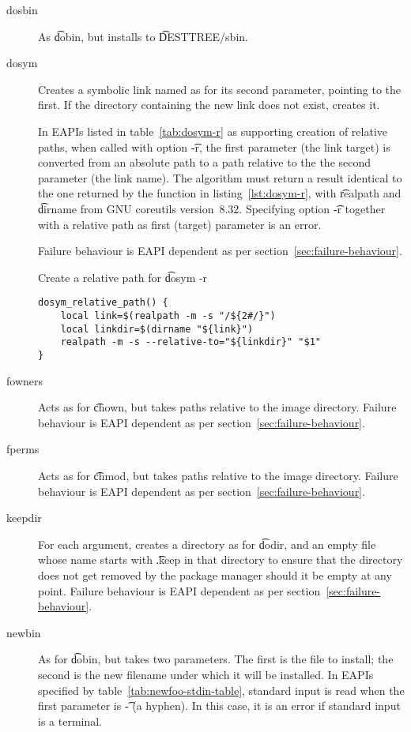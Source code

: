 \begin{description}
\item[dosbin] As \t{dobin}, but installs to \t{DESTTREE/sbin}.

\item[dosym] Creates a symbolic link named as for its second parameter, pointing to the first.
    If the directory containing the new link does not exist, creates it.

     In EAPIs listed in table~\ref{tab:dosym-r} as supporting creation
    of relative paths, when called with option \t{-r}, the first parameter (the link target) is
    converted from an absolute path to a path relative to the the second parameter (the link name).
    The  algorithm must return a result identical to the one returned by the function in
    listing~\ref{lst:dosym-r}, with \t{realpath} and \t{dirname} from GNU coreutils version~8.32.
    Specifying option \t{-r} together with a relative path as first (target) parameter is an error.

    Failure behaviour is EAPI dependent as per section~\ref{sec:failure-behaviour}.

\begin{listing}[h]
\caption{Create a relative path for \t{dosym -r}} \label{lst:dosym-r}
\begin{verbatim}
dosym_relative_path() {
    local link=$(realpath -m -s "/${2#/}")
    local linkdir=$(dirname "${link}")
    realpath -m -s --relative-to="${linkdir}" "$1"
}
\end{verbatim}
\end{listing}

\item[fowners] Acts as for \t{chown}, but takes paths relative to the image directory. Failure
    behaviour is EAPI dependent as per section~\ref{sec:failure-behaviour}.

\item[fperms] Acts as for \t{chmod}, but takes paths relative to the image directory. Failure
    behaviour is EAPI dependent as per section~\ref{sec:failure-behaviour}.

\item[keepdir] For each argument, creates a directory as for \t{dodir}, and an empty file whose
    name starts with \t{.keep} in that directory to ensure that the directory does not get removed
    by the package manager should it be empty at any point. Failure behaviour is EAPI dependent
    as per section~\ref{sec:failure-behaviour}.

\item[newbin]  As for \t{dobin}, but takes two parameters. The first is
    the file to install; the second is the new filename under which it will be installed. In EAPIs
    specified by table~\ref{tab:newfoo-stdin-table}, standard input is read when the first
    parameter is \t{-} (a hyphen). In this case, it is an error if standard input is a terminal.


\end{description}
